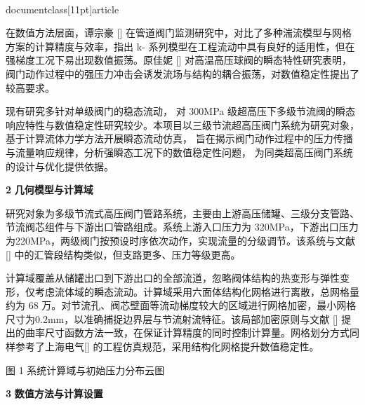 \\documentclass[11pt]{article}
\begin{document}
\par
在数值方法层面，谭宗豪 [\cite{9b9e80d2_e2e9_458b_9dae_18b0303b1c6c_超高压大口径气动快速截止阀的研制_李华贵}]  在管道阀门监测研究中，对比了多种湍流模型与网格方案的计算精度与效率，指出 k-  系列模型在工程流动中具有良好的适用性，但在强梯度工况下易出现数值振荡。原佳妮 [\cite{d9d53741_b3eb_4a59_8e8b_ce34e7f99554_02_DN65阀门稳态压损仿真阶段性报告}]  对高温高压球阀的瞬态特性研究表明， 阀门动作过程中的强压力冲击会诱发流场与结构的耦合振荡，对数值稳定性提出了较高要求。\par

现有研究多针对单级阀门的稳态流动， 对 300MPa 级超高压下多级节流阀的瞬态响应特性与数值稳定性研究较少。本项目以三级节流超高压阀门系统为研究对象， 基于计算流体力学方法开展瞬态流动仿真， 旨在揭示阀门动作过程中的压力传播与流量响应规律，分析强瞬态工况下的数值稳定性问题， 为同类超高压阀门系统的设计与优化提供依据。\par

\par
\textbf{2    }\textbf{几何模型与计算域}\par

研究对象为多级节流式高压阀门管路系统，主要由上游高压储罐、三级分支管路、节流阀芯组件与下游出口管路组成。系统上游入口压力为 320MPa，下游出口压力为220MPa，两级阀门按预设时序依次动作，实现流量的分级调节。该系统与文献 [\cite{f9aa7304_1ffe_4eea_aff7_c3174b482e09_高温高压气动球阀的结构优化及响应特性研究_原佳妮}]   中的汇管段结构类似，但支路更多、压力等级更高。\par

计算域覆盖从储罐出口到下游出口的全部流道，忽略阀体结构的热变形与弹性变形，仅考虑流体域的瞬态流动。计算域采用六面体结构化网格进行离散，总网格量约为 68 万。对节流孔、阀芯壁面等流动梯度较大的区域进行网格加密，最小网格尺寸为0.2mm，以准确捕捉边界层与节流射流特征。该局部加密原则与文献 [\cite{fb24c320_f14e_4d5d_811e_f1f4204fd0c3_超高压阀门流动特性与响应规律仿真}]  提出的曲率尺寸函数方法一致，在保证计算精度的同时控制计算量。网格划分方式同样参考了上海电气[\cite{fd169dda_f9ff_45e3_a3c8_72b02ab15ab5_高压大口径双向密封程控提升杆球阀的研制_梁连金}]  的工程仿真规范，采用结构化网格提升数值稳定性。\par

\par
图 1    系统计算域与初始压力分布云图\par

\par
\textbf{3    }\textbf{数值方法与计算设置}\par
\end{document}
